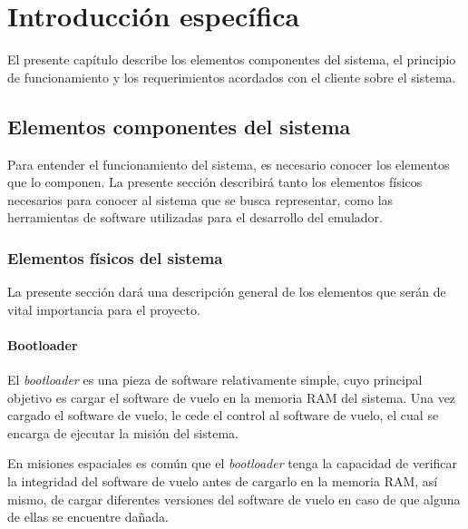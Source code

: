 \chapter{Introducción específica} %

El presente capítulo describe los elementos componentes del sistema, el principio de funcionamiento y los requerimientos acordados con el cliente sobre el sistema.


\label{Chapter2}



\section{Elementos componentes del sistema}
\label{sec:elementos_componentes_sistema}

Para entender el funcionamiento del sistema, es necesario conocer los elementos que lo componen. La presente sección describirá tanto los elementos físicos necesarios para conocer al sistema que se busca representar, como las herramientas de software utilizadas para el desarrollo del emulador.

\subsection{Elementos físicos del sistema}
\label{subsec:elementos_fisicos}

La presente sección dará una descripción general de los elementos que serán de vital importancia para el proyecto.

\subsubsection{Bootloader}
\label{subsec:bootloader}

El \textit{bootloader} es una pieza de software relativamente simple, cuyo principal objetivo es cargar el software de vuelo en la memoria RAM del sistema. Una vez cargado el software de vuelo, le cede el control al software de vuelo, el cual se encarga de ejecutar la misión del sistema.

En misiones espaciales es común que el \textit{bootloader} tenga la capacidad de verificar la integridad del software de vuelo antes de cargarlo en la memoria RAM, así mismo, de cargar diferentes versiones del software de vuelo en caso de que alguna de ellas se encuentre dañada.

